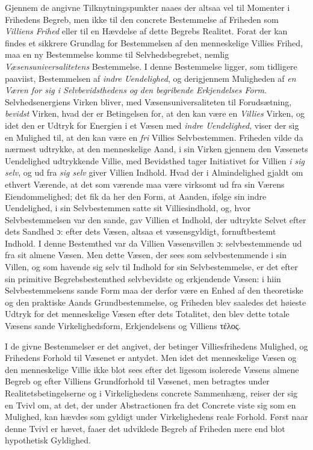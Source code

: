 Gjennem de angivne Tilknytningspunkter naaes der altsaa vel til Momenter i
Frihedens Begreb, men ikke til den concrete Bestemmelse af Friheden som
\emph{Villiens Frihed} eller til en Hævdelse af dette Begrebs Realitet. Forat der
kan findes et sikkrere Grundlag for Bestemmelsen af den menneskelige Villies
Frihed, maa en ny Bestemmelse komme til Selvhedsbegrebet, nemlig
\emph{Væsensuniversalitetens} Bestemmelse. I denne Bestemmelse ligger, som
tidligere paaviist, Bestemmelsen af \emph{indre Uendelighed}, og derigjennem
Muligheden af \emph{en Væren for sig i Selvbevidsthedens og den begribende
Erkjendelses Form}. Selvhedsenergiens Virken bliver, med Væsensuniversaliteten
til Forudsætning, \emph{bevidst} Virken, hvad der er Betingelsen for, at den kan
være en \emph{Villies} Virken, og idet den er Udtryk for Energien i et Væsen med
\emph{indre Uendelighed},
 viser der sig en Mulighed til, at den kan være en \emph{fri} Villies
Selvbestemmen. Friheden vilde da nærmest udtrykke, at den menneskelige Aand, i
sin Virken gjennem den Væsenets Uendelighed udtrykkende Villie, med Bevidsthed
tager Initiativet for Villien \emph{i sig selv}, og ud fra \emph{sig selv} giver
Villien Indhold. Hvad der i Almindelighed gjaldt om ethvert Værende, at det som
værende maa være virksomt ud fra sin Værens Eiendommelighed; det fik da her den
Form, at Aanden, ifølge sin indre Uendelighed, i sin Selvbestemmen satte sit
Villiesindhold, og, hvor Selvbestemmelsen var den sande, gav Villien et Indhold,
der udtrykte Selvet efter dets Sandhed ɔ: efter dets Væsen, altsaa et
væsensgyldigt, fornuftbestemt Indhold. I denne Bestemthed var da Villien
Væsensvillen ɔ: selvbestemmende ud fra sit almene Væsen. Men dette Væsen, der
sees som selvbestemmende i sin Villen, og som havende sig selv til Indhold for
sin Selvbestemmelse, er det efter sin primitive Begrebsbestemthed selvbevidste og
erkjendende Væsen: i hiin Selvbestemmelsens sande Form maa der derfor være en
Enhed af den theoretiske og den praktiske Aands Grundbestemmelse, og Friheden
blev saaledes det høieste Udtryk for det menneskelige Væsen efter dets Totalitet,
den blev dette totale Væsens sande Virkelighedsform, Erkjendelsens og Villiens
τέλος.

I de givne Bestemmelser er det angivet, der betinger Villiesfrihedens Mulighed,
og Frihedens Forhold til Væsenet er antydet. Men idet det menneskelige Væsen og
den menneskelige Villie ikke blot sees efter det ligesom isolerede Væsens almene
Begreb og efter Villiens Grundforhold til Væsenet, men betragtes under
Realitetsbetingelserne og i Virkelighedens concrete Sammenhæng, reiser der sig en
Tvivl om, at det, der under Abstractionen fra det Concrete viste sig som en
Mulighed, kan hævdes som gyldigt under Virkelighedens reale Forhold. Først naar
denne Tvivl er hævet, faaer det udviklede Begreb af Friheden mere end blot
hypothetisk Gyldighed.

